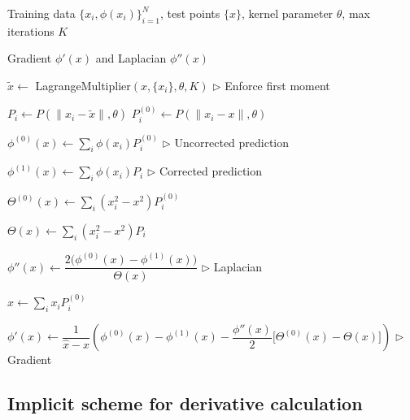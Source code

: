 \documentclass{article} %
\theoremstyle{plain}
\begin{document}
\begin{algorithm}[H]
\caption{Explicit scheme for KBR derivatives}
\label{alg:kbr_explicit_derivative}
\begin{algorithmic}[1]

\Require Training data $\{x_i,\phi(x_i)\}_{i=1}^N$, test points $\{x\}$, kernel parameter $\theta$, max iterations $K$

\Ensure Gradient $\phi'(x)$ and Laplacian $\phi''(x)$


    \State $\tilde{x} \leftarrow$ LagrangeMultiplier$(x,\{x_i\},\theta,K)$
    \hfill $\triangleright$ Enforce first moment

        \State $P_i \leftarrow P(\|x_i-\tilde{x}\|,\theta)$
        \State $P_i^{(0)} \leftarrow P(\|x_i-x\|,\theta)$
    \EndFor

    \State $\phi^{(0)}(x) \leftarrow \sum_i \phi(x_i)P_i^{(0)}$
    \hfill $\triangleright$ Uncorrected prediction

    \State $\phi^{(1)}(x) \leftarrow \sum_i \phi(x_i)P_i$
    \hfill $\triangleright$ Corrected prediction

    \State $\Theta^{(0)}(x) \leftarrow \sum_i (x_i^2-x^2)P_i^{(0)}$

    \State $\Theta(x) \leftarrow \sum_i (x_i^2-x^2)P_i$

    \State $\phi''(x) \leftarrow \dfrac{2\bigl(\phi^{(0)}(x)-\phi^{(1)}(x)\bigr)}{\Theta(x)}$
    \hfill $\triangleright$ Laplacian

    \State $\hat{x} \leftarrow \sum_i x_i P_i^{(0)}$

    \State $\phi'(x) \leftarrow
    \dfrac{1}{\hat{x}-x}
    \left(
    \phi^{(0)}(x)-\phi^{(1)}(x)
    -
    \dfrac{\phi''(x)}{2}
    \bigl[\Theta^{(0)}(x)-\Theta(x)\bigr]
    \right)$
    \hfill $\triangleright$ Gradient

\EndFor

\end{algorithmic}
\end{algorithm}


\subsection{Implicit scheme for derivative calculation}\label{asec:implicit}
\end{document}

